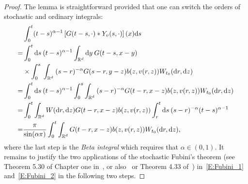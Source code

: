 \documentclass[a4paper,11pt]{article}%
\theoremstyle{plain}
\theoremstyle{definition}
\numberwithin{equation}{section}
\newcommand{\R}{\mathbb{R}}
\newcommand{\ud}{\ensuremath{\mathrm{d}}}
\begin{document}
\begin{proof}
  The lemma is straightforward provided that one can switch the orders of stochastic and ordinary
  integrals:
  \begin{align}
      & \int_0^t (t-s)^{\alpha-1}\left[G(t-s,\cdot)*Y_v(s,\cdot)\right](x) \ud s \notag                                                       \\
    = & \int_0^t \ud s\: (t-s)^{\alpha-1}\int_{\R^d} \ud y\: G(t-s,x-y) \notag                                                                \\
      & \times \int_0^s\: \int_{\R^d} \: (s-r)^{-\alpha}G(s-r,y-z)b(z,v(r,z))W_{t_0}(\ud r,\ud z) \notag                                      \\
    = & \int_0^t \ud s\: (t-s)^{\alpha-1} \int_0^s \int_{\R^d} \: (s-r)^{-\alpha}G(t-r,x-z)b(z,v(r,z))W_{t_0}(\ud r,\ud z) \label{E:Fubini_1} \\
    = & \int_0^t \int_{\R^d} W(\ud r,\ud z)G(t-r,x-z)b(z,v(r,z)) \int_r^t \ud s\: (s-r)^{-\alpha} (t-s)^{\alpha-1}\label{E:Fubini_2}          \\
    = & \dfrac{\pi}{\sin(\alpha \pi)}\int_0^t \int_{\R^d} G(t-r,x-z)b(z,v(r,z)) W_{t_0}(\ud r,\ud z),\notag
  \end{align}
  where the last step is the \textit{Beta integral} which requires that $\alpha\in (0,1)$. It
  remains to justify the two applications of the stochastic Fubini's theorem (see Theorem 5.30 of
  Chapter one in~\cite{dalang.khoshnevisan.ea:09:minicourse}, or also~\cite{walsh:86:introduction}
  or Theorem 4.33 of~\cite{da-prato.zabczyk:14:stochastic}) in~\eqref{E:Fubini_1}
  and~\eqref{E:Fubini_2} in the following two steps. \bigskip


\end{proof}
\end{document}
